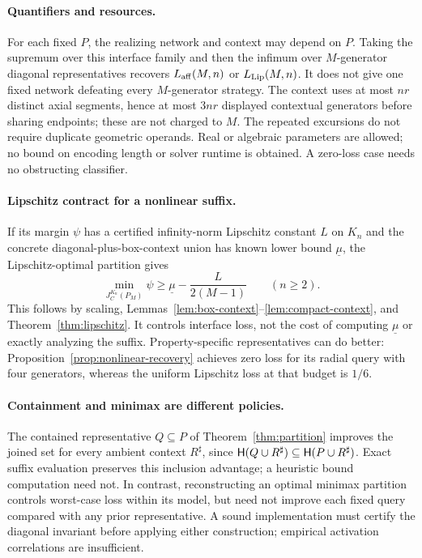 \paragraph{Quantifiers and resources.}
For each fixed $P$, the realizing network and context may depend on $P$. Taking the supremum over this interface family and then the infimum over $M$-generator diagonal representatives recovers $L_{\mathrm{aff}}(M,n)$ or $L_{\mathrm{Lip}}(M,n)$. It does not give one fixed network defeating every $M$-generator strategy. The context uses at most $nr$ distinct axial segments, hence at most $3nr$ displayed contextual generators before sharing endpoints; these are not charged to $M$. The repeated excursions do not require duplicate geometric operands. Real or algebraic parameters are allowed; no bound on encoding length or solver runtime is obtained. A zero-loss case needs no obstructing classifier.

\paragraph{Lipschitz contract for a nonlinear suffix.}
If its margin $\psi$ has a certified infinity-norm Lipschitz constant $L$ on $K_n$ and the concrete diagonal-plus-box-context union has known lower bound $\underline\mu$, the Lipschitz-optimal partition gives
\[
\min_{J_C^{K_n}(P_M)}\psi\ge\underline\mu-\frac{L}{2(M-1)}\qquad(n\ge2).
\]
This follows by scaling, Lemmas~\ref{lem:box-context}--\ref{lem:compact-context}, and Theorem~\ref{thm:lipschitz}. It controls interface loss, not the cost of computing $\underline\mu$ or exactly analyzing the suffix. Property-specific representatives can do better: Proposition~\ref{prop:nonlinear-recovery} achieves zero loss for its radial query with four generators, whereas the uniform Lipschitz loss at that budget is $1/6$.

\paragraph{Containment and minimax are different policies.}
The contained representative $Q\subseteq P$ of Theorem~\ref{thm:partition} improves the joined set for every ambient context $R^\sharp$, since $\mathsf H(Q\cup R^\sharp)\subseteq\mathsf H(P\cup R^\sharp)$. Exact suffix evaluation preserves this inclusion advantage; a heuristic bound computation need not. In contrast, reconstructing an optimal minimax partition controls worst-case loss within its model, but need not improve each fixed query compared with any prior representative. A sound implementation must certify the diagonal invariant before applying either construction; empirical activation correlations are insufficient.
